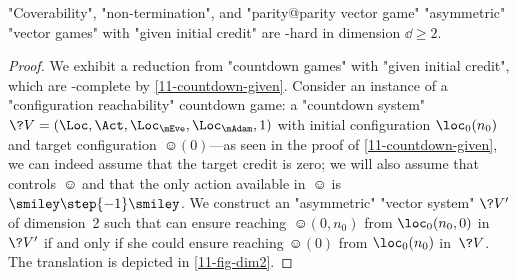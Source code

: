 \begin{theorem}\label{11-avag-two}
  "Coverability", "non-termination", and "parity@parity vector game"
  "asymmetric" "vector games" with "given initial credit" are
  \EXP-hard in dimension $\dd\geq 2$.
\end{theorem}
\begin{proof}
  We exhibit a reduction from "countdown games" with "given initial
  credit", which are \EXP-complete by \cref{11-countdown-given}.
  Consider an instance of a "configuration reachability" countdown
  game: a "countdown system"
  $\?V=(\Loc,\Act,\Loc_\mEve,\Loc_\mAdam,1)$ with initial
  configuration $\loc_0(n_0)$ and target
  configuration~$\smiley(0)$---as seen in the proof
  of \cref{11-countdown-given}, we can indeed assume that the target
  credit is zero; we will also assume that \Eve controls~$\smiley$ and
  that the only action available in~$\smiley$ is
  $\smiley\step{-1}\smiley$.  We construct an "asymmetric" "vector
  system" $\?V'$ of dimension~2 such that \Eve can ensure
  reaching~$\smiley(0,n_0)$ from $\loc_0(n_0,0)$ in~$\?V'$ if and only
  if she could ensure reaching $\smiley(0)$ from $\loc_0(n_0)$
  in~$\?V$.  The translation is depicted in \cref{11-fig-dim2}.
  

\end{proof}

